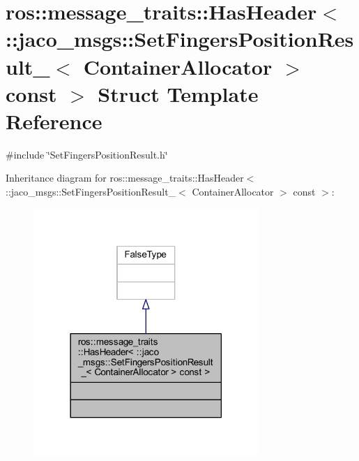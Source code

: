 \hypertarget{structros_1_1message__traits_1_1HasHeader_3_01_1_1jaco__msgs_1_1SetFingersPositionResult___3_01C7c96f7e9abc0e8d5d71906925dacf2e7}{}\section{ros\+:\+:message\+\_\+traits\+:\+:Has\+Header$<$ \+:\+:jaco\+\_\+msgs\+:\+:Set\+Fingers\+Position\+Result\+\_\+$<$ Container\+Allocator $>$ const $>$ Struct Template Reference}
\label{structros_1_1message__traits_1_1HasHeader_3_01_1_1jaco__msgs_1_1SetFingersPositionResult___3_01C7c96f7e9abc0e8d5d71906925dacf2e7}


{\ttfamily \#include \char`\"{}Set\+Fingers\+Position\+Result.\+h\char`\"{}}



Inheritance diagram for ros\+:\+:message\+\_\+traits\+:\+:Has\+Header$<$ \+:\+:jaco\+\_\+msgs\+:\+:Set\+Fingers\+Position\+Result\+\_\+$<$ Container\+Allocator $>$ const $>$\+:
\nopagebreak
\begin{figure}[H]
\begin{center}
\leavevmode
\includegraphics[width=242pt]{d5/dd9/structros_1_1message__traits_1_1HasHeader_3_01_1_1jaco__msgs_1_1SetFingersPositionResult___3_01C47b89fe610e841cd6047b06d655c5f1c}
\end{center}
\end{figure}



